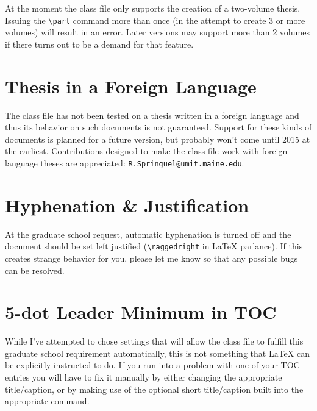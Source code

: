 At the moment the class file only supports the creation of a two-volume thesis.  Issuing the \verb=\part= command more than once (in the attempt to create 3 or more volumes) will result in an error.  Later versions may support more than 2 volumes if there turns out to be a demand for that feature.

\section{Thesis in a Foreign Language}
The class file has not been tested on a thesis written in a foreign language and thus its behavior on such documents is not guaranteed.  Support for these kinds of documents is planned for a future version, but probably won't come until 2015 at the earliest.  Contributions designed to make the class file work with foreign language theses are appreciated: \verb=R.Springuel@umit.maine.edu=.

\section{Hyphenation \& Justification}
At the graduate school request, automatic hyphenation is turned off and the document should be set left justified (\verb=\raggedright= in LaTeX parlance).  If this creates strange behavior for you, please let me know so that any possible bugs can be resolved.

\section{5-dot Leader Minimum in TOC}
While I've attempted to chose settings that will allow the class file to fulfill this graduate school requirement automatically, this is not something that LaTeX can be explicitly instructed to do.  If you run into a problem with one of your TOC entries you will have to fix it manually by either changing the appropriate title/caption, or by making use of the optional short title/caption built into the appropriate command.

\endinput

